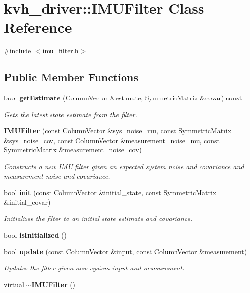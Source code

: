 \section{kvh\-\_\-driver\-:\-:\-I\-M\-U\-Filter \-Class \-Reference}
\label{classkvh__driver_1_1IMUFilter}


{\ttfamily \#include $<$imu\-\_\-filter.\-h$>$}

\subsection*{\-Public \-Member \-Functions}
\begin{DoxyCompactItemize}
\item 
bool {\bf get\-Estimate} (\-Column\-Vector \&estimate, \-Symmetric\-Matrix \&covar) const 
\begin{DoxyCompactList}\small\item\em \-Gets the latest state estimate from the filter. \end{DoxyCompactList}\item 
{\bf \-I\-M\-U\-Filter} (const \-Column\-Vector \&sys\-\_\-noise\-\_\-mu, const \-Symmetric\-Matrix \&sys\-\_\-noise\-\_\-cov, const \-Column\-Vector \&measurement\-\_\-noise\-\_\-mu, const \-Symmetric\-Matrix \&measurement\-\_\-noise\-\_\-cov)
\begin{DoxyCompactList}\small\item\em \-Constructs a new \-I\-M\-U filter given an expected system noise and covariance and measurement noise and covariance. \end{DoxyCompactList}\item 
bool {\bf init} (const \-Column\-Vector \&initial\-\_\-state, const \-Symmetric\-Matrix \&initial\-\_\-covar)
\begin{DoxyCompactList}\small\item\em \-Initializes the filter to an initial state estimate and covariance. \end{DoxyCompactList}\item 
bool {\bf is\-Initialized} ()
\item 
bool {\bf update} (const \-Column\-Vector \&input, const \-Column\-Vector \&measurement)
\begin{DoxyCompactList}\small\item\em \-Updates the filter given new system input and measurement. \end{DoxyCompactList}\item 
virtual {\bf $\sim$\-I\-M\-U\-Filter} ()
\end{DoxyCompactItemize}
